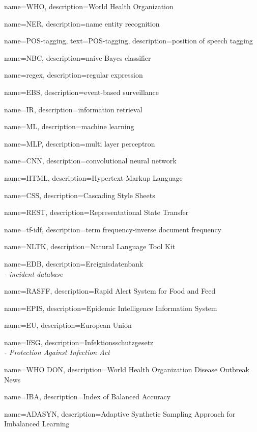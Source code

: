 {
  name={WHO},
  description={World Health Organization}
}

{
  name={NER},
  description={name entity recognition}
}

{
  name={POS-tagging},
  text={POS-tagging},
  description={position of speech tagging}
}

{
  name={NBC},
  description={naive Bayes classifier}
}

{
  name={regex},
  description={regular expression}
}

{
  name={EBS},
  description={event-based surveillance}
}

{
  name={IR},
  description={information retrieval}
}

{
  name={ML},
  description={machine learning}
}

{
  name={MLP},
  description={multi layer perceptron}
}

{
  name={CNN},
  description={convolutional neural network}
}

{
  name={HTML},
  description={Hypertext Markup Language}
}

{
  name={CSS},
  description={Cascading Style Sheets}
}

{
  name={REST},
  description={Representational State Transfer}
}

{
  name={tf-idf},
  description={term frequency-inverse document frequency}
}

{
  name={NLTK},
  description={Natural Language Tool Kit}
}

{
  name={EDB},
  description={Ereignisdatenbank\\
               \textit{- incident database}}
}

{
  name={RASFF},
  description={Rapid Alert System for Food and Feed}
}

{
  name={EPIS},
  description={Epidemic Intelligence Information System}
}

{
  name={EU},
  description={European Union}
}

{
  name={IfSG},
  description={Infektionsschutzgesetz\\
               \textit{- Protection Against Infection Act}}
}

{
  name={WHO DON},
  description={World Health Organization Disease Outbreak News}
}

{
  name={IBA},
  description={Index of Balanced Accuracy}
}

{
  name={ADASYN},
  description={Adaptive Synthetic Sampling Approach for Imbalanced Learning}
}
